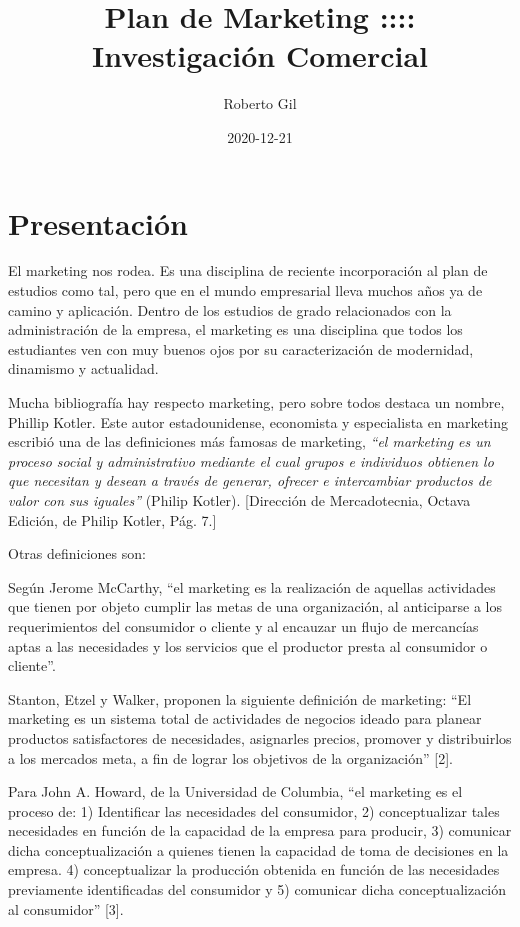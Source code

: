 \documentclass[
]{book}
\title{Plan de Marketing ::\textbar:: Investigación Comercial}
\author{Roberto Gil}
\date{2020-12-21}
\begin{document}
\maketitle

{
\setcounter{tocdepth}{1}
\tableofcontents
}
\hypertarget{presentaciuxf3n}{%
\chapter{Presentación}\label{presentaciuxf3n}}

El marketing nos rodea. Es una disciplina de reciente incorporación al plan de estudios como tal, pero que en el mundo empresarial lleva muchos años ya de camino y aplicación. Dentro de los estudios de grado relacionados con la administración de la empresa, el marketing es una disciplina que todos los estudiantes ven con muy buenos ojos por su caracterización de modernidad, dinamismo y actualidad.

Mucha bibliografía hay respecto marketing, pero sobre todos destaca un nombre, Phillip Kotler. Este autor estadounidense, economista y especialista en marketing escribió una de las definiciones más famosas de marketing, \emph{``el marketing es un proceso social y administrativo mediante el cual grupos e individuos obtienen lo que necesitan y desean a través de generar, ofrecer e intercambiar productos de valor con sus iguales''} (Philip Kotler). {[}Dirección de Mercadotecnia, Octava Edición, de Philip Kotler, Pág. 7.{]}

Otras definiciones son:

Según Jerome McCarthy, ``el marketing es la realización de aquellas actividades que tienen por objeto cumplir las metas de una organización, al anticiparse a los requerimientos del consumidor o cliente y al encauzar un flujo de mercancías aptas a las necesidades y los servicios que el productor presta al consumidor o cliente''.

Stanton, Etzel y Walker, proponen la siguiente definición de marketing: ``El marketing es un sistema total de actividades de negocios ideado para planear productos satisfactores de necesidades, asignarles precios, promover y distribuirlos a los mercados meta, a fin de lograr los objetivos de la organización'' {[}2{]}.

Para John A. Howard, de la Universidad de Columbia, ``el marketing es el proceso de:
1) Identificar las necesidades del consumidor, 2) conceptualizar tales necesidades en función de la capacidad de la empresa para producir, 3) comunicar dicha conceptualización a quienes tienen la capacidad de toma de decisiones en la empresa. 4) conceptualizar la producción obtenida en función de las necesidades previamente identificadas del consumidor y 5) comunicar dicha conceptualización al consumidor'' {[}3{]}.
\end{document}
